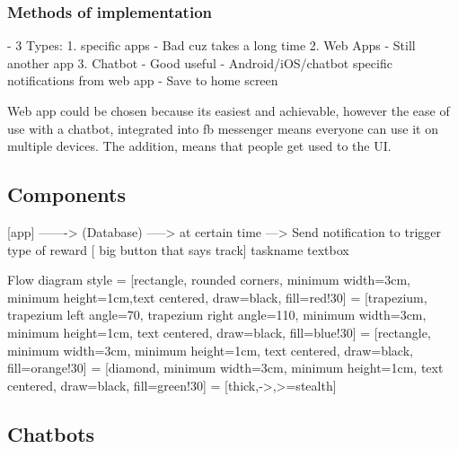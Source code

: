 \subsubsection*{Methods of implementation}
- 3 Types:
  1. specific apps
    - Bad cuz takes a long time
  2. Web Apps
    - Still another app
  3. Chatbot
    - Good useful
- Android/iOS/chatbot specific notifications from web app
- Save to home screen

Web app could be chosen because its easiest and achievable, however the ease of use with a chatbot, integrated into fb messenger means everyone can use it on multiple devices. The addition, means that people get used to the UI.

\subsection{Components}
  [app] -------> (Database) -----> at certain time ---> Send notification to trigger type of reward
  [ big button that says track]
  taskname textbox

Flow diagram style
 = [rectangle, rounded corners, minimum width=3cm, minimum height=1cm,text centered, draw=black, fill=red!30]
 = [trapezium, trapezium left angle=70, trapezium right angle=110, minimum width=3cm, minimum height=1cm, text centered, draw=black, fill=blue!30]
 = [rectangle, minimum width=3cm, minimum height=1cm, text centered, draw=black, fill=orange!30]
 = [diamond, minimum width=3cm, minimum height=1cm, text centered, draw=black, fill=green!30]
 = [thick,->,>=stealth]


\subsection{Chatbots}

